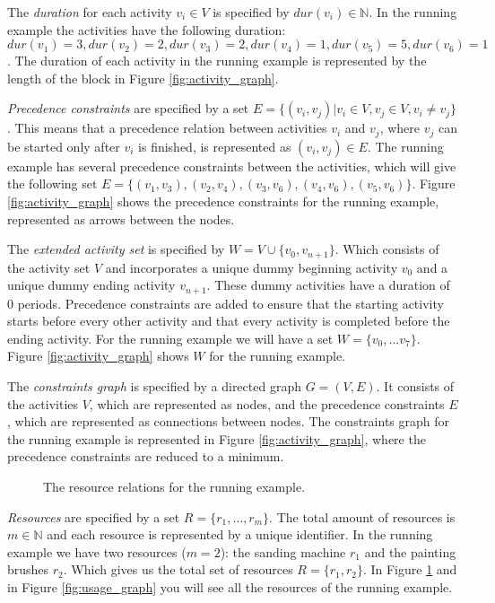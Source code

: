 \documentclass{article}
\theoremstyle{definition}
\newcommand{\dur}[1]{\ensuremath{dur(v_{#1})}} %
\begin{document}
The \emph{duration} for each activity $v_i \in V$ is specified by $\dur{i} \in \mathbb{N}$.
In the running example the activities have the following duration: $\dur{1} = 3, \dur{2} = 2, \dur{3} = 2, \dur{4} = 1, \dur{5} = 5, \dur{6} = 1$.
The duration of each activity in the running example is represented by the length of the block in Figure \ref{fig:activity_graph}.

\emph{Precedence constraints} are specified by a set $E = \{(v_i, v_j) | v_i \in V, v_j \in V, v_i \neq v_j\}$.
This means that a precedence relation between activities $v_i$ and $v_j$, where $v_j$ can be started only after $v_i$ is finished, is represented as $(v_i, v_j) \in E$.
The running example has several precedence constraints between the activities, which will give the following set $E = \{(v_1, v_3), (v_2, v_4), (v_3, v_6), (v_4, v_6), (v_5, v_6)\}$.
Figure \ref{fig:activity_graph} shows the precedence constraints for the running example, represented as arrows between the nodes.

The \emph{extended activity set} is specified by $W = V \cup \{v_0, v_{n+1}\}$.
Which consists of the activity set $V$ and incorporates a unique dummy beginning activity $v_0$ and a unique dummy ending activity $v_{n+1}$. 
These dummy activities have a duration of $0$ periods.
Precedence constraints are added to ensure that the starting activity starts before every other activity and that every activity is completed before the ending activity. 
For the running example we will have a set $W = \{v_0, \ldots v_7\}$.
Figure \ref{fig:activity_graph} shows $W$ for the running example. 

The \emph{constraints graph} is specified by a directed graph $G = (V, E)$.
It consists of the activities $V$, which are represented as nodes, and the precedence constraints $E$, which are represented as connections between nodes.
The constraints graph for the running example is represented in Figure \ref{fig:activity_graph}, where the precedence constraints are reduced to a minimum.

\begin{figure}[h]
	\centering
	
	\caption{The resource relations for the running example. }
	\label{fig:resource_graph}
\end{figure}

\emph{Resources} are specified by a set $R = \{r_1, \ldots, r_m\}$.
The total amount of resources is $m \in \mathbb{N}$ and each resource is represented by a unique identifier. %
In the running example we have two resources ($m = 2$): the sanding machine $r_1$ and the painting brushes $r_2$.
Which gives us the total set of resources $R = \{r_1, r_2\}$.
In Figure \ref{fig:resource_graph} and in Figure \ref{fig:usage_graph} you will see all the resources of the running example.
\end{document}
